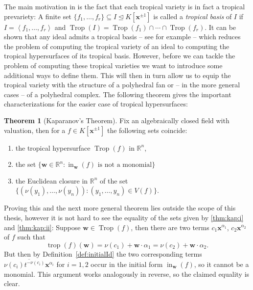 \documentclass[
  paper=a4,
  titlepage,
  bibliography=totoc,
  listof=totoc,
  pagesize=pdftex
]{scrartcl}
\numberwithin{figure}{section}
\numberwithin{equation}{section}
\numberwithin{table}{section}
\newcommand*\setR{\mathds{R}}
\newcommand*\ideal[1]{\left\langle #1 \right\rangle}
\let\vec\mathbf
\let\idealof\trianglelefteq
\DeclareMathOperator{\Trop}{Trop}
\DeclareMathOperator{\trop}{trop}
\DeclareMathOperator{\initial}{in}
\theoremstyle{definition}
\newtheorem{theorem}[definition]{Theorem}
\numberwithin{definition}{section}
\begin{document}
The main motivation in \cite{compTropVar} is the fact that each tropical variety is in
fact a tropical prevariety: A finite set $\{ f_1, \dots, f_r \} \subseteq I \idealof
K[\vec x^{\pm1}]$ is called a \emph{tropical basis} of $I$ if $I = \ideal{f_1, \dots,
f_r}$ and $\Trop(I) = \Trop(f_1) \cap \cdots \cap \Trop(f_r)$. It can be shown that any
ideal admits a tropical basis -- see for example \cite[Theorem~2.9]{compTropVar} -- which
reduces the problem of computing the tropical variety of an ideal to computing the
tropical hypersurfaces of its tropical basis. However, before we can tackle the problem of
computing these tropical varieties we want to introduce some additional ways to define
them. This will then in turn allow us to equip the tropical variety with the structure of
a polyhedral fan or -- in the more general cases -- of a polyhedral complex. The
following theorem gives the important characterizations for the easier case of tropical
hypersurfaces:

\begin{theorem}[Kaparanov's Theorem]
  \label{thm:kapranov}
  Fix an algebraically closed field with valuation, then for a $f \in K[\vec x^{\pm1}]$
  the following sets coincide:
  \begin{enumerate}
    \item the tropical hypersurface $\Trop(f)$ in $\setR^n$,
      \label{thm:kap:i}
    \item the set $\{ \vec w \in \setR^n : \initial_{\vec w}(f) \text{ is not a
      monomial}\}$
      \label{thm:kap:ii}
    \item the Euclidean closure in $\setR^n$ of the set $\{ (\nu(y_1), \dots, \nu(y_n)) :
      (y_1,\dots,y_n) \in V(f) \}$.
  \end{enumerate}
\end{theorem}

Proving this and the next more general theorem lies outside the scope of this thesis,
however it is not hard to see the equality of the sets given by \ref{thm:kap:i} and
\ref{thm:kap:ii}: Suppose $\vec w \in \Trop(f)$, then there are two terms $c_1 \vec
x^{\alpha_1}$, $c_2 \vec x^{\alpha_2}$ of $f$ such that
\[
  \trop(f)(\vec w) = \nu(c_1) + \vec w \cdot \alpha_1 = \nu(c_2) + \vec w \cdot \alpha_2.
\]
But then by Definition~\ref{def:initialId} the two corresponding terms
$\overline{\nu(c_i)t^{-\nu(c_i)}\vec x^{\alpha_i}}$ for $i=1,2$ occur in the initial form
$\initial_{\vec w}(f)$, so it cannot be a monomial. This argument works analogously in
reverse, so the claimed equality is clear.
\end{document}
